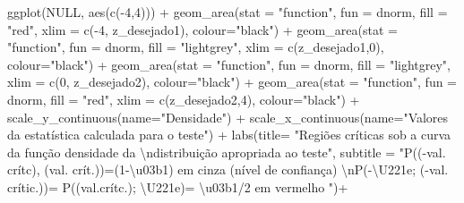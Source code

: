 \documentclass[
]{book}
\newenvironment{Shaded}{\begin{snugshade}}{\end{snugshade}}
\newcommand{\AttributeTok}[1]{\textcolor[rgb]{0.77,0.63,0.00}{#1}}
\newcommand{\ConstantTok}[1]{\textcolor[rgb]{0.00,0.00,0.00}{#1}}
\newcommand{\DecValTok}[1]{\textcolor[rgb]{0.00,0.00,0.81}{#1}}
\newcommand{\FunctionTok}[1]{\textcolor[rgb]{0.00,0.00,0.00}{#1}}
\newcommand{\NormalTok}[1]{#1}
\newcommand{\SpecialCharTok}[1]{\textcolor[rgb]{0.00,0.00,0.00}{#1}}
\newcommand{\StringTok}[1]{\textcolor[rgb]{0.31,0.60,0.02}{#1}}
\begin{document}
\begin{Shaded}
\begin{Highlighting}[]
\FunctionTok{ggplot}\NormalTok{(}\ConstantTok{NULL}\NormalTok{, }\FunctionTok{aes}\NormalTok{(}\FunctionTok{c}\NormalTok{(}\SpecialCharTok{{-}}\DecValTok{4}\NormalTok{,}\DecValTok{4}\NormalTok{))) }\SpecialCharTok{+}
  \FunctionTok{geom\_area}\NormalTok{(}\AttributeTok{stat =} \StringTok{"function"}\NormalTok{, }
            \AttributeTok{fun =}\NormalTok{ dnorm, }
            \AttributeTok{fill =} \StringTok{"red"}\NormalTok{, }
            \AttributeTok{xlim =} \FunctionTok{c}\NormalTok{(}\SpecialCharTok{{-}}\DecValTok{4}\NormalTok{, z\_desejado1),}
            \AttributeTok{colour=}\StringTok{"black"}\NormalTok{) }\SpecialCharTok{+}
  \FunctionTok{geom\_area}\NormalTok{(}\AttributeTok{stat =} \StringTok{"function"}\NormalTok{, }
            \AttributeTok{fun =}\NormalTok{ dnorm, }
            \AttributeTok{fill =} \StringTok{"lightgrey"}\NormalTok{, }
            \AttributeTok{xlim =} \FunctionTok{c}\NormalTok{(z\_desejado1,}\DecValTok{0}\NormalTok{),}
            \AttributeTok{colour=}\StringTok{"black"}\NormalTok{) }\SpecialCharTok{+}
  \FunctionTok{geom\_area}\NormalTok{(}\AttributeTok{stat =} \StringTok{"function"}\NormalTok{, }
            \AttributeTok{fun =}\NormalTok{ dnorm, }
            \AttributeTok{fill =} \StringTok{"lightgrey"}\NormalTok{, }
            \AttributeTok{xlim =} \FunctionTok{c}\NormalTok{(}\DecValTok{0}\NormalTok{, z\_desejado2),}
            \AttributeTok{colour=}\StringTok{"black"}\NormalTok{) }\SpecialCharTok{+}
  \FunctionTok{geom\_area}\NormalTok{(}\AttributeTok{stat =} \StringTok{"function"}\NormalTok{, }
            \AttributeTok{fun =}\NormalTok{ dnorm, }
            \AttributeTok{fill =} \StringTok{"red"}\NormalTok{, }
            \AttributeTok{xlim =} \FunctionTok{c}\NormalTok{(z\_desejado2,}\DecValTok{4}\NormalTok{),}
            \AttributeTok{colour=}\StringTok{"black"}\NormalTok{) }\SpecialCharTok{+}
  \FunctionTok{scale\_y\_continuous}\NormalTok{(}\AttributeTok{name=}\StringTok{"Densidade"}\NormalTok{) }\SpecialCharTok{+}
  \FunctionTok{scale\_x\_continuous}\NormalTok{(}\AttributeTok{name=}\StringTok{"Valores da estatística calculada para o teste"}\NormalTok{)  }\SpecialCharTok{+}
  \FunctionTok{labs}\NormalTok{(}\AttributeTok{title=} 
         \StringTok{"Regiões críticas sob a curva da função densidade da }\SpecialCharTok{\textbackslash{}n}\StringTok{distribuição apropriada ao teste"}\NormalTok{, }
       \AttributeTok{subtitle =} \StringTok{"P(({-}val. crítc), (val. crít.))=(1{-}\textbackslash{}u03b1) em cinza (nível de confiança) }\SpecialCharTok{\textbackslash{}n}\StringTok{P({-}\textbackslash{}U221e; ({-}val. crític.))= P((val.crítc.); \textbackslash{}U221e)= \textbackslash{}u03b1/2 em vermelho "}\NormalTok{)}\SpecialCharTok{+}

\end{Highlighting}
\end{Shaded}
\end{document}
